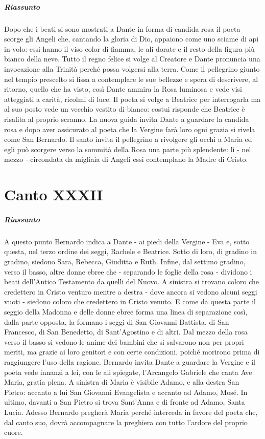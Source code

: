 \documentclass[a4paper, twoside, titlepage]{book}
\begin{document}
\paragraph{Riassunto} Dopo che i beati si sono mostrati a Dante in forma di candida rosa il poeta scorge gli Angeli che, cantando la gloria di Dio, appaiono come uno sciame di api in volo: essi hanno il viso color di fiamma, le ali dorate e il resto della figura più bianco della neve. Tutto il regno felice si volge al Creatore e Dante pronuncia una invocazione alla Trinità perché possa volgersi alla terra. Come il pellegrino giunto nel tempio prescelto si fissa a contemplare le sue bellezze e spera di descrivere, al ritorno, quello che ha visto, così Dante ammira la Rosa luminosa e vede visi atteggiati a carità, ricolmi di luce. Il poeta si volge a Beatrice per interrogarla ma al suo posto vede un vecchio vestito di bianco: costui risponde che Beatrice è risalita al proprio scranno. La nuova guida invita Dante a guardare la candida rosa e dopo aver assicurato al poeta che la Vergine farà loro ogni grazia si rivela come San Bernardo. Il santo invita il pellegrino a rivolgere gli occhi a Maria ed egli può scorgere verso la sommità della Rosa una parte più splendente: lì - nel mezzo - circondata da migliaia di Angeli essi contemplano la Madre di Cristo.

\chapter{Canto XXXII}

\paragraph{Riassunto} A questo punto Bernardo indica a Dante - ai piedi della Vergine - Eva e, sotto questa, nel terzo ordine dei seggi, Rachele e Beatrice. Sotto di loro, di gradino in gradino, siedono Sara, Rebecca, Giuditta e Ruth. Infine, dal settimo gradino, verso il basso, altre donne ebree che - separando le foglie della rosa - dividono i beati dell’Antico Testamento da quelli del Nuovo. A sinistra si trovano coloro che credettero in Cristo venturo mentre a destra - dove ancora si vedono alcuni seggi vuoti - siedono coloro che credettero in Cristo venuto. E come da questa parte il seggio della Madonna e delle donne ebree forma una linea di separazione così, dalla parte opposta, la formano i seggi di San Giovanni Battista, di San Francesco, di San Benedetto, di Sant’Agostino e di altri. Dal mezzo della rosa verso il basso si vedono le anime dei bambini che si salvarono non per propri meriti, ma grazie ai loro genitori e con certe condizioni, poiché morirono prima di raggiungere l’uso della ragione. Bernardo invita Dante a guardare la Vergine e il poeta vede innanzi a lei, con le ali spiegate, l’Arcangelo Gabriele che canta Ave Maria, gratia plena. A sinistra di Maria è visibile Adamo, e alla destra San Pietro: accanto a lui San Giovanni Evangelista e accanto ad Adamo, Mosé. In ultimo, davanti a San Pietro si trova Sant’Anna e di fronte ad Adamo, Santa Lucia. Adesso Bernardo pregherà Maria perché interceda in favore del poeta che, dal canto suo, dovrà accompagnare la preghiera con tutto l’ardore del proprio cuore.
\end{document}
